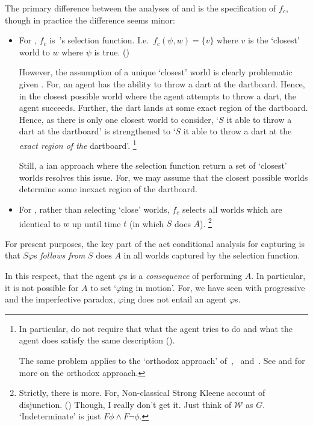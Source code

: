 \begin{note}
  The primary difference between the analyses of \citeauthor{Mandelkern:2017aa} and \citeauthor{Boylan:2020aa} is the specification of \(f_{c}\), though in practice the difference seems minor:
  \begin{itemize}
  \item
    For \citeauthor{Mandelkern:2017aa},
    \(f_{c}\) is~\citeauthor{Stalnaker:1968vt}'s selection function.
    I.e.\ \(f_{c}(\psi, w) = \{v\}\) where \(v\) is the `closest' world to \(w\) where \(\psi\) is true.
    (\citeyear[Cf.][314]{Mandelkern:2017aa})

    However, the assumption of a unique `closest' world is clearly problematic given \BoyVS{}.
    For, an agent has the ability to throw a dart at the dartboard.
    Hence, in the closest possible world where the agent attempts to throw a dart, the agent succeeds.
    Further, the dart lands at some exact region of the dartboard.
    Hence, as there is only one closest world to consider, `\(S\) it able to throw a dart at the dartboard' is strengthened to `\(S\) it able to throw a dart at the \emph{exact region of the} dartboard'.%
    \footnote{
      In particular, \citeauthor{Mandelkern:2017aa} do not require that what the agent tries to do and what the agent does satisfy the same description (\citeyear[310,314]{Mandelkern:2017aa}).

      The same problem applies to the `orthodox approach' of~\textcite{Hilpinen:1969vw}, \textcite{Kratzer:1977aa,Kratzer:1981vn}~and~\textcite{Lewis:1976us}.
      See \textcite[\S1.3]{Boylan:2020aa} and \textcite[\S2]{Mandelkern:2017aa} for more on the orthodox approach.
    }

    Still, a \citeauthor{Lewis:1973th}ian approach where the selection function return a set of `closest' worlds resolves this issue.
    For, we may assume that the closest possible worlds determine some inexact region of the dartboard.
  \item
    For \citeauthor{Boylan:2020aa}, rather than selecting `close' worlds, \(f_{c}\) selects all worlds which are identical to \(w\) up until time \(t\) (in which \(S\) does \(A\)).%
    \footnote{
      Strictly, there is more.
      For, Non-classical Strong Kleene account of disjunction.
      (\citeyear[\S5]{Boylan:2020aa})
      Though, I really don't get it.
      Just think of \(\mathcal{W}\) as \(G\).
      `Indeterminate' is just \(F \phi \land F \lnot \phi\).
    }
  \end{itemize}

  For present purposes, the key part of the act conditional analysis for capturing \AbControl{} is that \(S \varphi\)s \emph{follows from} \(S\text{ does }A\) in all worlds captured by the selection function.

  In this respect, that the agent \(\varphi\)s is a \emph{consequence} of performing \(A\).
  In particular, it is not possible for \(A\) to set `\(\varphi\)ing in motion'.
  For, we have seen with progressive and the imperfective paradox, \(\varphi\)ing does not entail an agent \(\varphi\)s.
\end{note}

